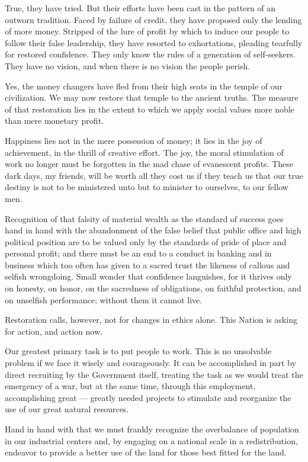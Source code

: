 \documentclass[a4paper]{amsbook}
\begin{document}
True, they have tried. But their efforts have been cast in the pattern of an outworn tradition. Faced by failure of credit, they have proposed only the lending of more money. Stripped of the lure of profit by which to induce our people to follow their false leadership, they have resorted to exhortations, pleading tearfully for restored confidence. They only know the rules of a generation of self-seekers. They have no vision, and when there is no vision the people perish.

Yes, the money changers have fled from their high seats in the temple of our civilization. We may now restore that temple to the ancient truths. The measure of that restoration lies in the extent to which we apply social values more noble than mere monetary profit.

Happiness lies not in the mere possession of money; it lies in the joy of achievement, in the thrill of creative effort. The joy, the moral stimulation of work no longer must be forgotten in the mad chase of evanescent profits. These dark days, my friends, will be worth all they cost us if they teach us that our true destiny is not to be ministered unto but to minister to ourselves, to our fellow men.

Recognition of that falsity of material wealth as the standard of success goes hand in hand with the abandonment of the false belief that public office and high political position are to be valued only by the standards of pride of place and personal profit; and there must be an end to a conduct in banking and in business which too often has given to a sacred trust the likeness of callous and selfish wrongdoing. Small wonder that confidence languishes, for it thrives only on honesty, on honor, on the sacredness of obligations, on faithful protection, and on unselfish performance; without them it cannot live.

Restoration calls, however, not for changes in ethics alone. This Nation is asking for action, and action now.

Our greatest primary task is to put people to work. This is no unsolvable problem if we face it wisely and courageously. It can be accomplished in part by direct recruiting by the Government itself, treating the task as we would treat the emergency of a war, but at the same time, through this employment, accomplishing great — greatly needed projects to stimulate and reorganize the use of our great natural resources.

Hand in hand with that we must frankly recognize the overbalance of population in our industrial centers and, by engaging on a national scale in a redistribution, endeavor to provide a better use of the land for those best fitted for the land.
\end{document}
